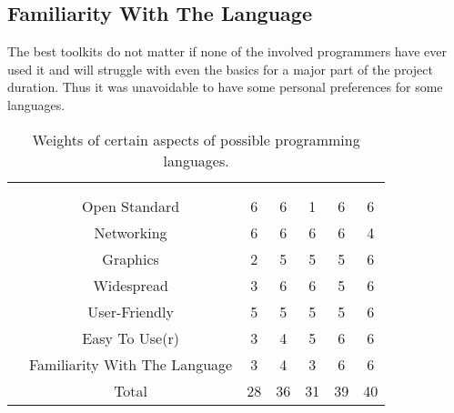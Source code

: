\subsection*{Familiarity With The Language} The best toolkits do not matter if none of the involved programmers have ever used it and will struggle with even the basics for a major part of the project duration. Thus it was unavoidable to have some personal preferences for some languages.

\begin{table}
\begin{centering}
\setlength{\extrarowheight}{2pt}
\begin{tabular}{*{7}{c|}}
    \multicolumn{2}{c}{}        & \multicolumn{2}{c}{}\\\cline{3-7}
    \multicolumn{1}{c}{}    &   & \parbox[t]{2mm}{}%
                                & \parbox[t]{2mm}{}%
                                & \parbox[t]{2mm}{}%
                                & \parbox[t]{2mm}{}%
                                & \parbox[t]{2mm}{} \\
                & Open Standard & 6 & 6 & 1 & 6 & 6\\
                   & Networking & 6 & 6 & 6 & 6 & 4\\
                     & Graphics & 2 & 5 & 5 & 5 & 6\\
                   & Widespread & 3 & 6 & 6 & 5 & 6\\
                & User-Friendly & 5 & 5 & 5 & 5 & 6\\
               & Easy To Use(r) & 3 & 4 & 5 & 6 & 6\\
& Familiarity With The Language & 3 & 4 & 3 & 6 & 6\\
                       & Total &28 &36 &31 &39 & 40\\
\end{tabular}
\caption{Weights of certain aspects of possible programming languages.}
\label{fig:gui_language_choices}
\end{centering}
\end{table}

